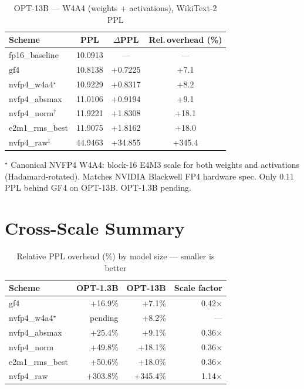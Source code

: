 \documentclass{article}
\begin{document}
\begin{table}[h]
\centering
\caption{OPT-13B --- W4A4 (weights + activations), WikiText-2 PPL}
\label{tab:opt13b}
\begin{tabular}{l S[table-format=2.4] S[table-format=+2.4] S[table-format=+3.1,table-sign-mantissa]}
\toprule
Scheme & {PPL} & {$\Delta$PPL} & {Rel.\,overhead (\%)} \\
\midrule
fp16\_baseline            & 10.0913 & {---}   & {---}   \\
\addlinespace[2pt]
gf4                       & 10.8138 & +0.7225 & +7.1    \\
nvfp4\_w4a4$^\star$       & 10.9229 & +0.8317 & +8.2    \\
nvfp4\_absmax             & 11.0106 & +0.9194 & +9.1    \\
nvfp4\_norm$^\dagger$     & 11.9221 & +1.8308 & +18.1   \\
e2m1\_rms\_best           & 11.9075 & +1.8162 & +18.0   \\
nvfp4\_raw$^\ddagger$     & 44.9463 & +34.855 & +345.4  \\
\bottomrule
\end{tabular}
\end{table}

$^\star$ Canonical NVFP4 W4A4: block-16 E4M3 scale for both weights and activations
(Hadamard-rotated). Matches NVIDIA Blackwell FP4 hardware spec.
Only 0.11\,PPL behind GF4 on OPT-13B. OPT-1.3B pending.

\section{Cross-Scale Summary}

\begin{table}[h]
\centering
\caption{Relative PPL overhead (\%) by model size --- smaller is better}
\label{tab:crossscale}
\begin{tabular}{l r r r}
\toprule
Scheme & OPT-1.3B & OPT-13B & Scale factor \\
\midrule
gf4                   & +16.9\%  & +7.1\%   & 0.42$\times$ \\
nvfp4\_w4a4$^\star$   & pending  & +8.2\%   & —            \\
nvfp4\_absmax         & +25.4\%  & +9.1\%   & 0.36$\times$ \\
nvfp4\_norm           & +49.8\%  & +18.1\%  & 0.36$\times$ \\
e2m1\_rms\_best       & +50.6\%  & +18.0\%  & 0.36$\times$ \\
nvfp4\_raw            & +303.8\% & +345.4\% & 1.14$\times$ \\
\bottomrule
\end{tabular}
\end{table}
\end{document}
